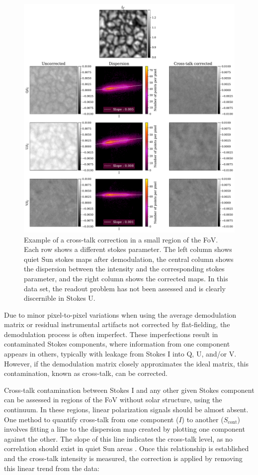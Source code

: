 \begin{figure}
  \includegraphics[width=\textwidth]{figures/Pipeline/xtalk_example.pdf}
  \caption[Cross-talk correction.]{Example of a cross-talk correction in a small region of the FoV. Each row shows a different stokes parameter. The left column shows quiet Sun stokes maps after demodulation, the central column shows the dispersion between the intensity and the corresponding stokes parameter, and the right column shows the corrected maps. In this data set, the readout problem has not been assessed and is clearly discernible in Stokes U.}
    \label{fig_pipeline: xtalk}
\end{figure}


Due to minor pixel-to-pixel variations when using the average demodulation matrix or residual instrumental artifacts not corrected by flat-fielding, the demodulation process is often imperfect. These imperfections result in contaminated Stokes components, where information from one component appears in others, typically with leakage from Stokes I into Q, U, and/or V. However, if the demodulation matrix closely approximates the ideal matrix, this contamination, known as cross-talk, can be corrected.

Cross-talk contamination between Stokes I and any other given Stokes component can be assessed in regions of the FoV without solar structure, using the continuum. In these regions, linear polarization signals should be almost absent. One method to quantify cross-talk from one component ($I$) to another ($S_{\text{cont}}$) involves fitting a line to the dispersion map created by plotting one component against the other. The slope of this line indicates the cross-talk level, as no correlation should exist in quiet Sun areas \citep{crosstalk-manolo}. Once this relationship is established and the cross-talk intensity is measured, the correction is applied by removing this linear trend from the data:

